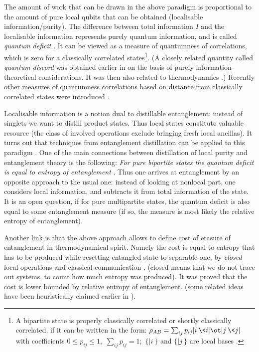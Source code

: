 \documentclass[rmp,12pt,preprint]{revtex4-2}
\begin{document}
The amount of work that can be drawn in the above paradigm is
proportional to the amount of pure local qubits that can be obtained
(localisable information/purity). The difference between total
information $I$ and the localisable information represents purely
quantum information, and is called {\it quantum deficit}
\cite{OHHH2001}. It can be viewed as a measure of quantumness of correlations, which is zero for a classically correlated states\footnote {A bipartite state is properly classically correlated or shortly classically correlated, if it can be written in the form: $\rho_{AB}= \sum_{ij} p_{ij}|i\>\<i|\ot |j\>\<j|$ with coefficients $
0 \leq p _{ij}\leq 1$,\, $\sum_{ij} p_{ij} =1$;\, $\{|i\>\}$ and  $\{|j\>\}$ are local bases \cite{OHHH2001}.}. (A closely related quantity called {\it quantum  discord} was obtained earlier in \cite{Zurek-demons-02} on the basis
of purely information-theoretical considerations. It was then also
related to thermodynamics \cite{Zurek-discord}.) Recently other measures of quantumness correlations
based on distance from classically correlated states  were  introduced \cite {GroismanKM2007,SaiTohRN2007}.


Localisable information is a notion dual to distillable entanglement:
instead of singlets we want to distill product states.  Thus local
states constitute valuable resource (the class of involved operations
exclude bringing fresh local ancillas). It turns out that techniques
from entanglement distillation can be applied to this paradigm
\cite{nlocc,SynakHH04}. One of the main connections between
distillation of local purity and entanglement theory is the following:
{\it For pure bipartite states the quantum deficit is equal to entropy
  of entanglement} \cite{nlocc}. Thus one arrives at entanglement by
an opposite approach to the usual one: instead of looking at nonlocal
part, one considers local information, and subtracts it from total
information of the state. It is an open question, if for pure
multipartite states, the quantum deficit is also equal to some
entanglement measure (if so, the measure is most likely the relative
entropy of entanglement).

Another link is that the above approach allows to define cost of
erasure of entanglement in thermodynamical spirit. Namely the cost is
equal to entropy that has to be produced while resetting entangled
state to separable one, by {\it closed} local operations and classical
communication \cite{huge-delta}. (closed means that we do not trace
out systems, to count how much entropy was produced).  It was proved
that the cost is lower bounded by relative entropy of
entanglement. (some related ideas have been heuristically claimed
earlier in \cite{Vedral1999}).
\end{document}
